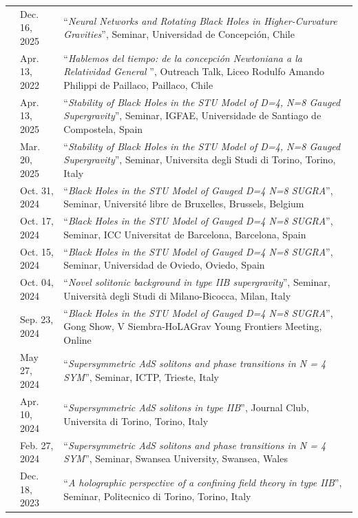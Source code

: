 \documentclass[11pt]{article}
\newenvironment{cvblock}[3]
{
\noindent
\begin{longtable}{p{#1}  >{\raggedright\arraybackslash}p{#2} p{#3}}
}
{
\end{longtable}
}
\newcommand{\cventry}[3]{\textbf{#1} & #2 & #3 \\ }
\newcommand{\talk}[2]{\small “\textit{#1}”, #2\vspace{0.2cm}}
\begin{document}
\begin{cvblock}{0cm}{2.3cm}{13cm}
	\noindent \cventry{}{\small Dec. 16, 2025}{\talk{Neural Networks and Rotating Black Holes in Higher-Curvature Gravities}{Seminar, Universidad de Concepción, Chile}}

	\cventry{}{\small Apr. 13, 2022}{\talk{Hablemos del tiempo: de la concepción Newtoniana a la Relatividad General }{Outreach Talk, Liceo Rodulfo Amando Philippi de Paillaco, Paillaco, Chile}}

	\cventry{}{\small Apr. 13, 2025}{\talk{Stability of Black Holes in the STU Model of D=4, N=8 Gauged Supergravity}{Seminar, IGFAE, Universidade de Santiago de Compostela, Spain}}

	\cventry{}{\small Mar. 20, 2025}{\talk{Stability of Black Holes in the STU Model of D=4, N=8 Gauged Supergravity}{Seminar, Universita degli Studi di Torino, Torino, Italy}}

	\cventry{}{\small Oct. 31, 2024}{\talk{Black Holes in the STU Model of Gauged D=4 N=8 SUGRA}{Seminar, Université libre de Bruxelles, Brussels, Belgium}}

	\cventry{}{\small Oct. 17, 2024}{\talk{Black Holes in the STU Model of Gauged D=4 N=8 SUGRA}{Seminar, ICC Universitat de Barcelona, Barcelona, Spain}}

	\cventry{}{\small Oct. 15, 2024}{\talk{Black Holes in the STU Model of Gauged D=4 N=8 SUGRA}{Seminar, Universidad de Oviedo, Oviedo, Spain}}

	\cventry{}{\small Oct. 04, 2024}{\talk{Novel solitonic background in type IIB supergravity}{Seminar, Università degli Studi di Milano-Bicocca, Milan, Italy}}

	\cventry{}{\small Sep. 23, 2024}{\talk{Black Holes in the STU Model of Gauged D=4 N=8 SUGRA}{Gong Show, V Siembra-HoLAGrav Young Frontiers Meeting, Online}}

	\cventry{}{\small May 27, 2024}{\talk{Supersymmetric AdS solitons and phase transitions in N = 4 SYM}{Seminar, ICTP, Trieste, Italy}}

	\cventry{}{\small Apr. 10, 2024}{\talk{Supersymmetric AdS solitons in type IIB}{Journal Club, Universita di Torino, Torino, Italy}}

	\cventry{}{\small Feb. 27, 2024}{\talk{Supersymmetric AdS solitons and phase transitions in N = 4 SYM}{Seminar, Swansea University, Swansea, Wales}}

	\cventry{}{\small Dec. 18, 2023}{\talk{A holographic perspective of a confining field theory in type IIB}{Seminar, Politecnico di Torino, Torino, Italy}}


\end{cvblock}
\end{document}
